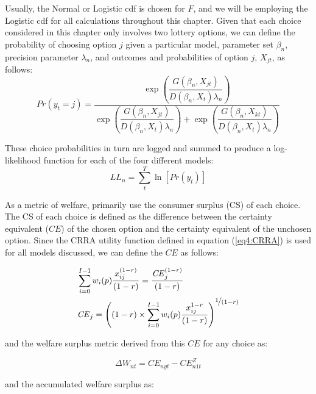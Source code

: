 \documentclass[11pt,a4paper]{report}
\newcommand\CE{\ensuremath{\mathit{CE}}}    %
\newcommand\Prob{\ensuremath{\mathit{Pr}}}  %
\begin{document}
Usually, the Normal or Logistic cdf is chosen for $F$, and we will be employing the Logistic cdf for all calculations throughout this chapter.
Given that each choice considered in this chapter only involves two lottery options, we can define the probability of choosing option $j$ given a particular model, parameter set $\beta_n$, precision parameter $\lambda_n$, and outcomes and probabilities of option $j$, $X_{jt}$, as follows:
\begin{equation}
	\label{eq4:RE.f}
	{\Prob}(y_t=j) =\dfrac{\exp\!\left( \dfrac{ G(\beta_n,X_{jt}) }{ D(\beta_n,X_{t})\lambda_n }  \right)}{  \exp\!\left( \dfrac{ G(\beta_n,X_{jt}) }{ D(\beta_n,X_{t})\lambda_n }  \right) + \exp\!\left( \dfrac{ G(\beta_n,X_{kt}) }{ D(\beta_n,X_{t})\lambda_n }  \right)    }
\end{equation}

These choice probabilities in turn are logged and summed to produce a log-likelihood function for each of the four different models:
\begin{equation}
	\label{eq4:ll}
	\ensuremath{\mathit{LL_n}} = \sum_{t}^T \ln \left[ {\Prob}(y_t) \right]
\end{equation}

As a metric of welfare, \textcite{Harrison2016} primarily use the consumer surplus (CS) of each choice.
The CS of each choice is defined as the difference between the certainty equivalent ({\CE}) of the chosen option and the certainty equivalent of the unchosen option.
Since the CRRA utility function defined in equation (\ref{eq4:CRRA}) is used for all models discussed, we can define the {\CE} as follows:

\begin{align}
	\label{eq4:CEcalc}
	\begin{split}
		&\sum_{i=0}^{I-1} w_i(p) \frac{x_{ij}^{(1-r)}}{(1-r)} = \frac{ {\CE}_j^{(1-r)}}{(1-r)}\\
		&{\CE}_j =  \left( (1-r) \times \sum_{i=0}^{I-1} w_i(p) \frac{x_{ij}^{1-r}}{(1-r)} \right)^{ \displaystyle\nicefrac{1}{(1-r)} }
	\end{split}
\end{align}

\noindent and the welfare surplus metric derived from this {\CE} for any choice as:

\begin{equation}
	\label{eq4:wsurplus}
	\Delta W_{nt} =  {\CE}_{nyt} - {\CE}_{n1t}^Z
\end{equation}

\noindent and the accumulated welfare surplus as:
\end{document}
